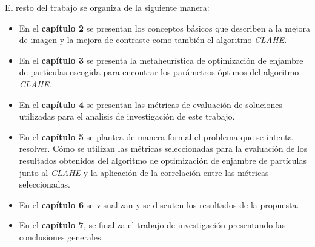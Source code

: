 El resto del trabajo se organiza de la siguiente manera:

\begin{itemize}
    \item En el \textbf{capítulo 2} se presentan los conceptos básicos que describen a la mejora de imagen y la mejora de contraste como también el algoritmo \textit{CLAHE}.
    \item En el \textbf{capítulo 3} se presenta la metaheurística de optimización de enjambre de partículas escogida para encontrar los parámetros óptimos del algoritmo \textit{CLAHE}.
    \item En el \textbf{capítulo 4} se presentan las métricas de evaluación de soluciones utilizadas para el analisis de investigación de este trabajo.    
    \item En el \textbf{capítulo 5} se plantea de manera formal el problema que se intenta resolver. Cómo se utilizan las métricas seleccionadas para la evaluación de los resultados obtenidos del algoritmo de optimización de enjambre de partículas junto al \textit{CLAHE} y la aplicación de la correlación entre las métricas seleccionadas.    
    \item En el \textbf{capítulo 6} se visualizan y se discuten los resultados de la propuesta.
    \item En el \textbf{capítulo 7}, se finaliza el trabajo de investigación presentando las conclusiones generales.    
\end{itemize}